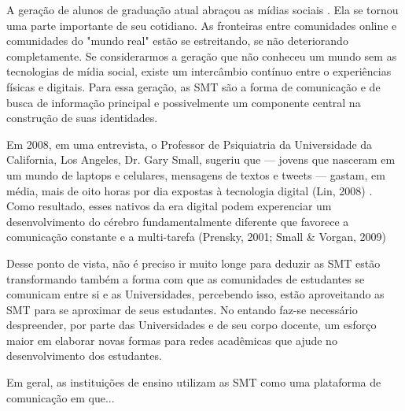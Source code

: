 A geração de alunos de graduação atual abraçou as mídias sociais . Ela se tornou
uma parte importante de seu cotidiano. As fronteiras entre comunidades
online e comunidades do "mundo real" estão se estreitando, se não deteriorando
completamente. Se considerarmos a geração que não conheceu um mundo sem as
tecnologias de mídia social, existe um intercâmbio contínuo entre o experiências
físicas e digitais. Para essa geração, as SMT são a forma de comunicação e de
busca de informação principal e possivelmente um componente central na construção
de suas identidades.

Em 2008, em uma entrevista, o Professor de Psiquiatria da Universidade da California,
Los Angeles, Dr. Gary Small, sugeriu que — jovens que nasceram em um mundo de laptops
e celulares, mensagens de textos e tweets — gastam, em média, mais de oito horas
por dia expostas à tecnologia digital (Lin, 2008)
. Como resultado,
esses nativos da era digital podem experenciar um desenvolvimento do cérebro
fundamentalmente diferente que favorece a comunicação constante e a multi-tarefa
(Prensky, 2001; Small \& Vorgan, 2009)

Desse ponto de vista, não é preciso ir muito longe para deduzir as SMT estão
transformando também a forma com que as comunidades de estudantes se comunicam
entre si e as Universidades, percebendo isso, estão aproveitando as SMT para
se aproximar de seus estudantes. No entando faz-se necessário despreender, por
parte das Universidades e de seu corpo docente, um esforço maior em elaborar
novas formas para redes acadêmicas que ajude no desenvolvimento dos estudantes.

Em geral, as instituições de ensino utilizam as SMT como uma plataforma de
comunicação em que... 


